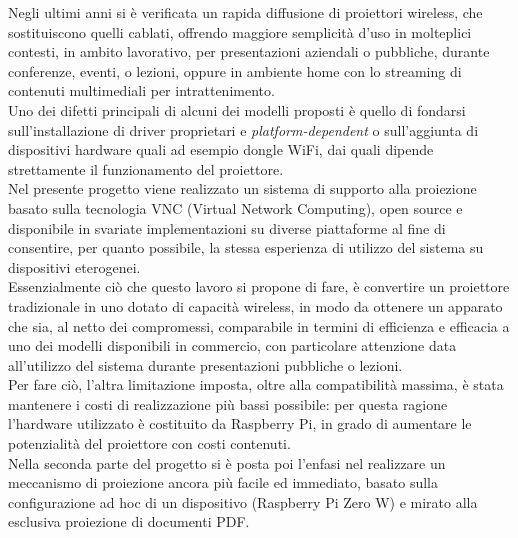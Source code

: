 Negli ultimi anni si è verificata un rapida diffusione di proiettori wireless, che sostituiscono quelli cablati, offrendo maggiore semplicità d'uso in molteplici contesti, in ambito lavorativo, per presentazioni aziendali o pubbliche, durante conferenze, eventi, o lezioni, oppure in ambiente home con lo streaming di contenuti multimediali per intrattenimento.\\
Uno dei difetti principali di alcuni dei modelli proposti è quello di fondarsi sull'installazione di driver proprietari e \textit{platform-dependent} o sull'aggiunta di dispositivi hardware quali ad esempio dongle WiFi, dai quali dipende strettamente il funzionamento del proiettore. \\
Nel presente progetto viene realizzato un sistema di supporto alla proiezione basato sulla tecnologia VNC (Virtual Network Computing), open source e disponibile in svariate implementazioni su diverse piattaforme al fine di consentire, per quanto possibile, la stessa esperienza di utilizzo del sistema su dispositivi eterogenei.\\
Essenzialmente ciò che questo lavoro si propone di fare, è convertire un proiettore tradizionale in uno dotato di capacità wireless, in modo da ottenere un apparato che sia, al netto dei compromessi, comparabile in termini di efficienza e efficacia a uno dei modelli disponibili in commercio, con particolare attenzione data all'utilizzo del sistema durante presentazioni pubbliche o lezioni.\\
Per fare ciò, l'altra limitazione imposta, oltre alla compatibilità massima, è stata mantenere i costi di realizzazione più bassi possibile: per questa ragione l'hardware utilizzato è costituito da Raspberry Pi, in grado di aumentare le potenzialità del proiettore con costi contenuti.\\
Nella seconda parte del progetto si è posta poi l'enfasi nel realizzare un meccanismo di proiezione ancora più facile ed immediato, basato sulla configurazione ad hoc di un dispositivo (Raspberry Pi Zero W) e mirato alla esclusiva proiezione di documenti PDF.